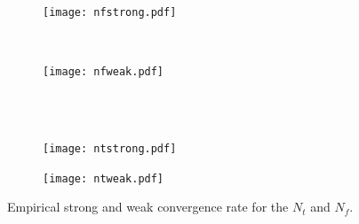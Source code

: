 \documentclass[11pt]{amsart}
\begin{document}
\begin{figure}
    \centering
    \begin{subfigure}[b]{0.4\textwidth}
        \texttt{[image: nfstrong.pdf]}
        \label{fig:gull}
    \end{subfigure}
    ~ %
    \begin{subfigure}[b]{0.4\textwidth}
        \texttt{[image: nfweak.pdf]}
        \label{fig:tiger}
    \end{subfigure}
    \\
    ~ %
    \begin{subfigure}[b]{0.4\textwidth}
        \texttt{[image: ntstrong.pdf]}
        \label{fig:mouse}
    \end{subfigure}
        \begin{subfigure}[b]{0.4\textwidth}
        \texttt{[image: ntweak.pdf]}
        \label{fig:mouse}
    \end{subfigure}
    \caption{\label{fig:empInfDimRates}Empirical strong and weak convergence rate for
    the $N_t$ and $N_f$.}
\end{figure}




\appendix
\end{document}
